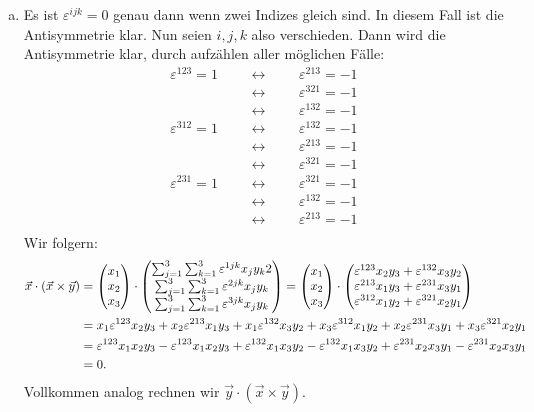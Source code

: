 \documentclass{theozettel}
\renewcommand{\epsilon}{\varepsilon}
\begin{document}
\begin{enumerate}[(a)]
	\item 	Es ist $\epsilon^{ijk} = 0$ genau dann wenn zwei Indizes gleich sind. In diesem Fall ist die Antisymmetrie klar. Nun seien $i,j,k$ also verschieden. Dann wird die Antisymmetrie klar, durch aufzählen aller möglichen Fälle:
			\begin{align*}
				\epsilon^{123} = 1 &&& \longleftrightarrow &&& \epsilon^{213} = -1 \\
				&&& \longleftrightarrow &&& \epsilon^{321} = -1 \\
				&&& \longleftrightarrow &&& \epsilon^{132} = -1 \\
				\epsilon^{312} = 1 &&& \longleftrightarrow &&& \epsilon^{132} = -1 \\
				&&& \longleftrightarrow &&& \epsilon^{213} = -1 \\
				&&& \longleftrightarrow &&& \epsilon^{321} = -1 \\
				\epsilon^{231} = 1 &&& \longleftrightarrow &&& \epsilon^{321} = -1 \\
				&&& \longleftrightarrow &&& \epsilon^{132} = -1 \\
				&&& \longleftrightarrow &&& \epsilon^{213} = -1 \\
			\end{align*}
			Wir folgern:
			\begin{align*}
				\vec{x} \cdot (\vec{x} \times \vec{y}) &= \mqty(x_{1} \\ x_{2} \\ x_{3}) \cdot \mqty( \sum_{j=1}^{3}\sum_{k=1}^{3} \epsilon^{1jk}x_{j}y_{k}2 \\ \sum_{j=1}^{3}\sum_{k=1}^{3} \epsilon^{2jk}x_{j}y_{k} \\ \sum_{j=1}^{3}\sum_{k=1}^{3} \epsilon^{3jk}x_{j}y_{k}) = \mqty(x_{1} \\ x_{2} \\ x_{3}) \cdot \mqty( \epsilon^{123}x_{2}y_{3} + \epsilon^{132}x_{3}y_{2} \\ \epsilon^{213}x_{1}y_{3} + \epsilon^{231}x_{3}y_{1} \\ \epsilon^{312}x_{1}y_{2} + \epsilon^{321}x_{2}y_{1} ) \\		
				&= x_{1}\epsilon^{123}x_{2}y_{3} +x_{2}\epsilon^{213}x_{1}y_{3} + x_{1}\epsilon^{132}x_{3}y_{2} + x_{3}\epsilon^{312}x_{1}y_{2} + x_{2}\epsilon^{231}x_{3}y_{1} + x_{3}\epsilon^{321}x_{2}y_{1} \\
				&= 	\epsilon^{123}x_{1}x_{2}y_{3} - \epsilon^{123}x_{1}x_{2}y_{3} + \epsilon^{132}x_{1}x_{3}y_{2} -\epsilon^{132}x_{1}x_{3}y_{2} + \epsilon^{231}x_{2}x_{3}y_{1} - \epsilon^{231}x_{2}x_{3}y_{1} \\ &= 0.
			\end{align*}
			Vollkommen analog rechnen wir $\vec{y} \cdot (\vec{x} \times \vec{y})$. 
\end{enumerate}
\end{document}
